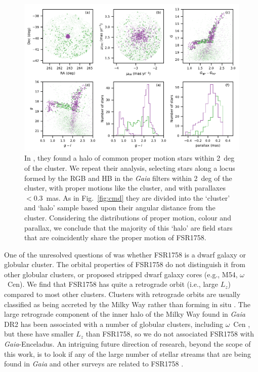 \documentclass[fleqn,usenatbib,letters]{mnras}
\begin{document}
\begin{figure}
	\includegraphics[width=\textwidth]{figures/not_a_halo.pdf}
    \caption{In , they found a halo of common proper motion stars within 2~deg of the cluster. We repeat their analysis, selecting stars along a locus formed by the RGB and HB in the \textit{Gaia} filters within 2~deg of the cluster, with proper motions like the cluster, and with parallaxes $<0.3$~mas. As in Fig.\ \ref{fig:cmd} they are divided into the `cluster' and `halo' sample based upon their angular distance from the cluster. Considering the distributions of proper motion, colour and parallax, we conclude that the majority of this `halo' are field stars that are coincidently share the proper motion of FSR1758.}
    \label{fig:not_a_halo}
\end{figure}

One of the unresolved questions of  was whether FSR1758 is a dwarf galaxy or globular cluster. The orbital properties of FSR1758 do not distinguish it from other globular clusters, or proposed stripped dwarf galaxy cores (e.g., M54, $\omega$~Cen). We find that FSR1758 has quite a retrograde orbit (i.e., large $L_z$) compared to most other clusters. Clusters with retrograde orbits are usually classified as being accreted by the Milky Way rather than forming in situ \citep[e.g.,][]{Kruijssen2018}. The large retrograde component of the inner halo of the Milky Way found in \textit{Gaia} DR2 has been associated with a number of globular clusters, including $\omega$~Cen \citep{Helmi:2018wy}, but these have smaller $L_z$ than FSR1758, so we do not associated FSR1758 with \textit{Gaia}-Enceladus. An intriguing future direction of research, beyond the scope of this work, is to look if any of the large number of stellar streams that are being found in \textit{Gaia} and other surveys are related to FSR1758 \citep[e.g.,][]{Shipp2018,Ibata:2018wn,Malhan:2018ko,Ibata2019}.
\end{document}
